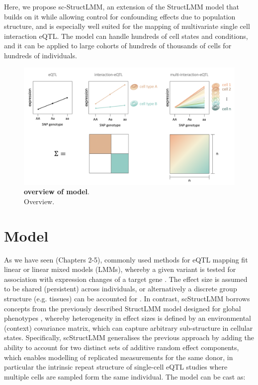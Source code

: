 Here, we propose sc-StructLMM, an extension of the StructLMM model that builds on it while allowing control for confounding effects due to population structure, and is especially well suited for the mapping of multivariate single cell interaction eQTL. 
The model can handle hundreds of cell states and conditions, and it can be applied to large cohorts of hundreds of thousands of cells for hundreds of  individuals.

\begin{figure}[htbp]
\centering
\includegraphics[width=15.5cm]{Chapter6/Fig/sc_structlmm_overview.png}
\caption[overview of model]{\textbf{overview of model}.\\
Overview.}
\label{fig:sc_structlmm_overview}
\end{figure}


\clearpage

\section{Model} 

As we have seen (Chapters 2-5), commonly used methods for eQTL mapping fit linear or linear mixed models (LMMs),  whereby a given variant is tested for association with expression changes of a target gene \cite{kilpinen2017common}. 
The effect size is assumed to be shared (persistent) across individuals, or alternatively a discrete group structure (e.g. tissues) can be accounted for \cite{fusi2012joint}. 
In contrast, scStructLMM borrows concepts from the previously described StructLMM model designed for global phenotypes \cite{moore2019linear}, whereby heterogeneity in effect sizes is defined by an environmental (context) covariance matrix, which can capture arbitrary sub-structure in cellular states. 
Specifically, scStructLMM generalises the previous approach by adding the ability to  account for two distinct sets of additive random effect components, which enables modelling of replicated measurements for the same donor, in particular the intrinsic repeat structure of single-cell eQTL studies where multiple cells are sampled form the same individual. 
The model can be cast as:

